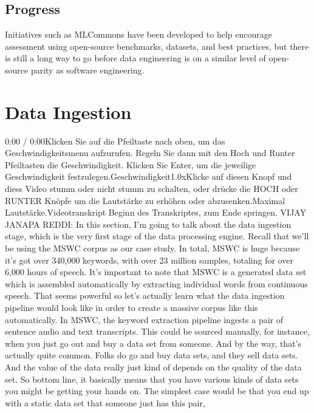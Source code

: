 {{{{    \subsection{Progress}
    
    Initiatives such as MLCommons have been developed to help encourage assessment using open-source benchmarks, datasets, and best practices, but there is still a long way to go before data engineering is on a similar level of open-source parity as software engineering.        
        
\section{Data Ingestion}

    0:00 / 0:00Klicken Sie auf die Pfeiltaste nach oben, um das Geschwindigkeitsmenu aufzurufen. Regeln Sie dann mit den Hoch und Runter Pfeiltasten die Geschwindigkeit. Klicken Sie Enter, um die jeweilige Geschwindigkeit festzulegen.Geschwindigkeit1.0xKlicke auf diesen Knopf und diess Video stumm oder nicht stumm zu schalten, oder drücke die HOCH oder RUNTER Knöpfe um die Lautstärke zu erhöhen oder abzusenken.Maximal Lautstärke.Videotranskript
    Beginn des Transkriptes, zum Ende springen.
    VIJAY JANAPA REDDI: In this section, I'm going
    to talk about the data ingestion stage, which
    is the very first stage of the data processing engine.
    Recall that we'll be using the MSWC corpus as our case study.
    In total, MSWC is huge because it's got over 340,000 keywords,
    with over 23 million samples, totaling for over 6,000 hours of speech.
    It's important to note that MSWC is a generated data set which
    is assembled automatically by extracting individual words
    from continuous speech.
    That seems powerful so let's actually learn what the data ingestion
    pipeline would look like in order to create a massive corpus like this
    automatically.
    In MSWC, the keyword extraction pipeline ingests a pair
    of sentence audio and text transcripts.
    This could be sourced manually, for instance, when you just go out
    and buy a data set from someone.
    And by the way, that's actually quite common.
    Folks do go and buy data sets, and they sell data sets.
    And the value of the data really just kind of depends
    on the quality of the data set.
    So bottom line, it basically means that you
    have various kinds of data sets you might be getting your hands on.
    The simplest case would be that you end up
    with a static data set that someone just has this pair,
}}}}
